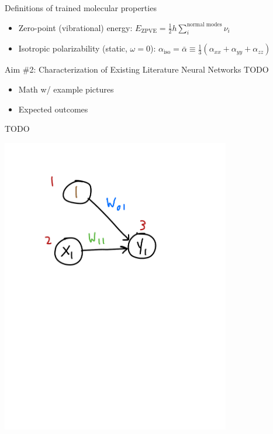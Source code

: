 \documentclass[xetex,compress]{beamer}
\begin{document}
\begin{frame}{Definitions of trained molecular properties}
  \begin{itemize}
  \item Zero-point (vibrational) energy: \(E_{\text{ZPVE}} = \frac{1}{2} h \sum_{i}^{\text{normal modes}} \nu_{i}\)
  \item Isotropic polarizability (static, \(\omega = 0\)): \(\alpha_{\text{iso}} = \bar{\alpha} \equiv \frac{1}{3} (\alpha_{xx} + \alpha_{yy} + \alpha_{zz})\)
  \end{itemize}
\end{frame}

\begin{frame}{Aim \#2: Characterization of Existing Literature Neural Networks}
  TODO
  \begin{itemize}
  \item Math w/ example pictures
  \item Expected outcomes
  \end{itemize}
\end{frame}

\begin{frame}{TODO}
  \begin{center}
    \includegraphics[width=0.75\textwidth]{./figures/lr_nn_4.pdf}
  \end{center}
\end{frame}
\end{document}
